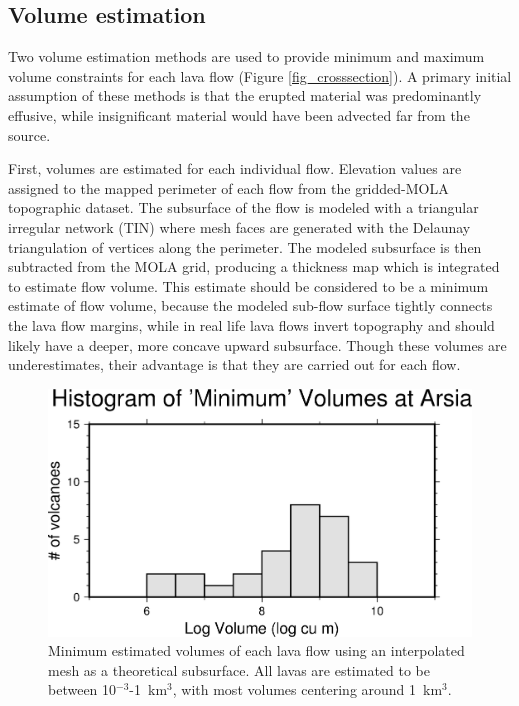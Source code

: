\documentclass[12pt,letter]{article}
\begin{document}
\subsection{Volume estimation}\label{sec_volume}






Two volume estimation methods are used to provide minimum and maximum volume constraints for each lava flow (Figure \ref{fig_crosssection}). A primary initial assumption of these methods is that the erupted material was predominantly effusive, while insignificant material would have been advected far from the source.

First, volumes are estimated for each individual flow. Elevation values are assigned to the mapped perimeter of each flow from the gridded-MOLA topographic dataset. The subsurface of the flow is modeled with a triangular irregular network (TIN) where mesh faces are generated with the Delaunay triangulation of vertices along the perimeter. The modeled subsurface is then subtracted from the MOLA grid, producing a thickness map which is integrated to estimate flow volume. This estimate should be considered to be a minimum estimate of flow volume, because the modeled sub-flow surface tightly connects the lava flow margins, while in real life lava flows invert topography and should likely have a deeper, more concave upward subsurface. Though these volumes are underestimates, their advantage is that they are carried out for each flow.


\begin{figure}
\centering
\includegraphics[width=0.4\linewidth]{figures/volumehist.png}
\caption{Minimum estimated volumes of each lava flow using an interpolated mesh as a theoretical subsurface. All lavas are estimated to be between 10$^{-3}$-1~km$^3$, with most volumes centering around 1~km$^3$.}
\label{fig_volumehistogram}
\end{figure}
\end{document}
